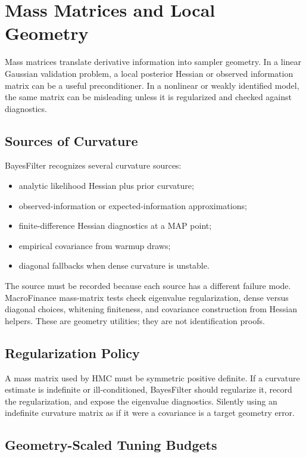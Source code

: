 \chapter{Mass Matrices and Local Geometry}
\label{ch:bf-mass-matrices}

Mass matrices translate derivative information into sampler geometry.  In a
linear Gaussian validation problem, a local posterior Hessian or observed
information matrix can be a useful preconditioner.  In a nonlinear or weakly
identified model, the same matrix can be misleading unless it is regularized and
checked against diagnostics.

\section{Sources of Curvature}
\label{sec:bf-curvature-sources}

BayesFilter recognizes several curvature sources:
\begin{itemize}
  \item analytic likelihood Hessian plus prior curvature;
  \item observed-information or expected-information approximations;
  \item finite-difference Hessian diagnostics at a MAP point;
  \item empirical covariance from warmup draws;
  \item diagonal fallbacks when dense curvature is unstable.
\end{itemize}
The source must be recorded because each source has a different failure mode.
MacroFinance mass-matrix tests check eigenvalue regularization, dense versus
diagonal choices, whitening finiteness, and covariance construction from
Hessian helpers.  These are geometry utilities; they are not identification
proofs.

\section{Regularization Policy}
\label{sec:bf-mass-regularization}

A mass matrix used by HMC must be symmetric positive definite.  If a curvature
estimate is indefinite or ill-conditioned, BayesFilter should regularize it,
record the regularization, and expose the eigenvalue diagnostics.  Silently
using an indefinite curvature matrix as if it were a covariance is a target
geometry error.

\section{Geometry-Scaled Tuning Budgets}
\label{sec:bf-geometry-scaled-tuning-budgets}


